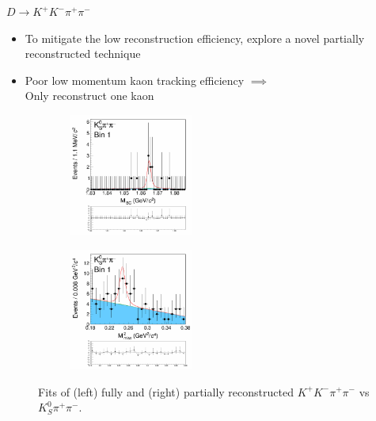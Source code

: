 \documentclass{beamer}
\begin{document}
\begin{frame}{$D\to K^+K^-\pi^+\pi^-$}
  \begin{itemize}
    \item{To mitigate the low reconstruction efficiency, explore a novel partially reconstructed technique}
    \item{Poor low momentum kaon tracking efficiency $\implies$ \\Only reconstruct one kaon}
  \end{itemize}
  \begin{figure}
    \centering
    \begin{subfigure}{0.5\textwidth}
      \centering
      \includegraphics[height=4.0cm,trim={0 14.0cm 0 0},clip=true]{Figures/DoubleTagYield_DoubleTag_SCMB_KKpipi_vs_KSpipi_SignalBin0_TagBin1.png}
    \end{subfigure}%
    \begin{subfigure}{0.5\textwidth}
      \centering
      \includegraphics[height=4.0cm,trim={0 14.0cm 0 0},clip=true]{Figures/DoubleTagYield_DoubleTag_SCMB_KKpipi_vs_KSpipiPartReco_SignalBin0_TagBin1.png}
    \end{subfigure}
    \caption*{Fits of (left) fully and (right) partially reconstructed $K^+K^-\pi^+\pi^-$ vs $K_S^0\pi^+\pi^-$.}
  \end{figure}
\end{frame}
\end{document}

